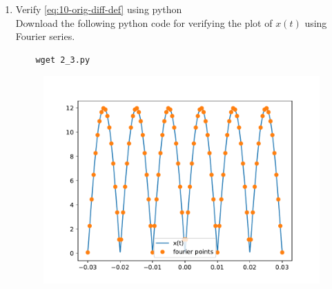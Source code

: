 \documentclass[journal,12pt,twocolumn]{IEEEtran}
\renewcommand\thesection{\arabic{section}}
\begin{document}
\begin{enumerate}[label=\thesection.\arabic*,ref=\thesection.\theenumi]
\item Verify 
\eqref{eq:10-orig-diff-def}
using python \\
\solution
Download the following python code for verifying the plot of $x(t)$ using Fourier series.
\begin{lstlisting}
	wget 2_3.py
\end{lstlisting}
\vspace{-2em}
\begin{figure}[!htb]
	\includegraphics[width=\columnwidth]{figs/2_3.pdf}
	\caption{}
\end{figure}



\end{enumerate}
\end{document}
